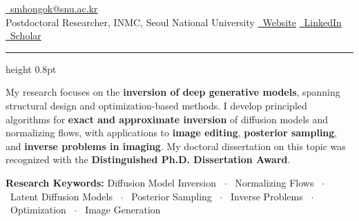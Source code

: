 



\noindent
{} \hfill \href{mailto:smhongok@snu.ac.kr}{\faEnvelope \ smhongok@snu.ac.kr} \\
{\large Postdoctoral Researcher, INMC, Seoul National University} \hfill \href{https://smhongok.github.io}{\faGlobe \ Website} \quad \href{https://linkedin.com/in/sm-hong}{\faLinkedin \ LinkedIn} \quad \href{https://scholar.google.com/citations?user=YOUR_ID}{\faGraduationCap \ Scholar}

\vspace{0.5ex}
\hrule height 0.8pt
\vspace{1ex}

\noindent
My research focuses on the \textbf{inversion of deep generative models}, spanning structural design and optimization-based methods.
I develop principled algorithms for \textbf{exact and approximate inversion} of diffusion models and normalizing flows, with applications to \textbf{image editing}, \textbf{posterior sampling}, and \textbf{inverse problems in imaging}.
My doctoral dissertation on this topic was recognized with the \textbf{Distinguished Ph.D. Dissertation Award}.

\vspace{2pt}

\noindent\textbf{Research Keywords:}
Diffusion Model Inversion \ $\cdot$ \ Normalizing Flows \ $\cdot$ \ Latent Diffusion Models \ $\cdot$ \ Posterior Sampling \ $\cdot$ \ Inverse Problems \ $\cdot$ \ Optimization \ $\cdot$ \ Image Generation

\vspace{2pt}




